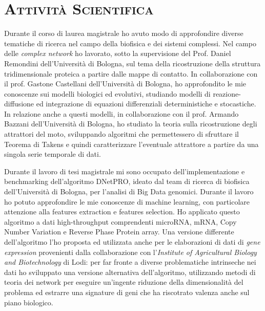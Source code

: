 
 {
\section*{\scshape{Attività Scientifica}}

Durante il corso di laurea magistrale ho avuto modo di approfondire diverse tematiche di ricerca nel campo della biofisica e dei sistemi complessi.
Nel campo delle \emph{complex network} ho lavorato, sotto la supervisione del Prof. Daniel Remondini dell'Università di Bologna, sul tema della ricostruzione della struttura tridimensionale proteica a partire dalle mappe di contatto.
In collaborazione con il prof. Gastone Castellani dell'Università di Bologna, ho approfondito le mie conoscenze sui modelli biologici ed evolutivi, studiando modelli di reazione-diffusione ed integrazione di equazioni differenziali deterministiche e stocastiche.
In relazione anche a questi modelli, in collaborazione con il prof. Armando Bazzani dell'Università di Bologna, ho studiato la teoria sulla ricostruzione degli attrattori del moto, sviluppando algoritmi che permettessero di sfruttare il Teorema di Takens e quindi caratterizzare l'eventuale attrattore a partire da una singola serie temporale di dati.

Durante il lavoro di tesi magistrale mi sono occupato dell'implementazione e benchmarking dell'algoritmo DNetPRO, ideato dal team di ricerca di biofisica dell'Università di Bologna, per l'analisi di Big Data genomici.
Durante il lavoro ho potuto approfondire le mie conoscenze di machine learning, con particolare attenzione alla features extraction e features selection.
Ho applicato questo algoritmo a dati high-throughput comprendenti microRNA, mRNA, Copy Number Variation e Reverse Phase Protein array.
Una versione differente dell'algoritmo l'ho proposta ed utilizzata anche per le elaborazioni di dati di \emph{gene expression} provenienti dalla collaborazione con l'\emph{Institute of Agricultural Biology and Biotechnology} di Lodi: per far fronte a diverse problematiche intrinseche nei dati ho sviluppato una versione alternativa dell'algoritmo, utilizzando metodi di teoria dei network per eseguire un'ingente riduzione della dimensionalità del problema ed estrarre una signature di geni che ha riscotrato valenza anche sul piano biologico.

}
